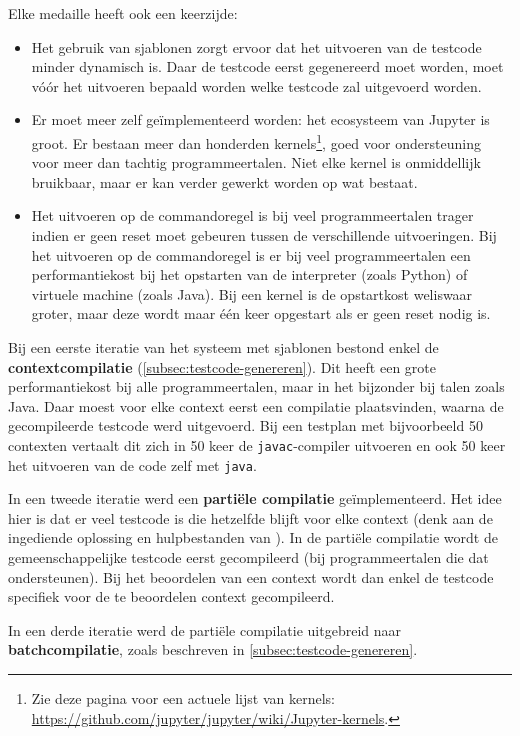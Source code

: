 Elke medaille heeft ook een keerzijde:
\begin{itemize}
    \item Het gebruik van sjablonen zorgt ervoor dat het uitvoeren van de testcode minder dynamisch is.
    Daar de testcode eerst gegenereerd moet worden, moet vóór het uitvoeren bepaald worden welke testcode zal uitgevoerd worden.
    \item Er moet meer zelf geïmplementeerd worden: het ecosysteem van Jupyter is groot.
    Er bestaan meer dan honderden kernels\footnote{Zie deze pagina voor een actuele lijst van kernels: \url{https://github.com/jupyter/jupyter/wiki/Jupyter-kernels}.}, goed voor ondersteuning voor meer dan tachtig programmeertalen.
    Niet elke kernel is onmiddellijk bruikbaar, maar er kan verder gewerkt worden op wat bestaat.
    \item Het uitvoeren op de commandoregel is bij veel programmeertalen trager indien er geen reset moet gebeuren tussen de verschillende uitvoeringen.
    Bij het uitvoeren op de commandoregel is er bij veel programmeertalen een performantiekost bij het opstarten van de interpreter (zoals Python) of virtuele machine (zoals Java).
    Bij een kernel is de opstartkost weliswaar groter, maar deze wordt maar één keer opgestart als er geen reset nodig is.
\end{itemize}

Bij een eerste iteratie van het systeem met sjablonen bestond enkel de \textbf{contextcompilatie} (\cref{subsec:testcode-genereren}).
Dit heeft een grote performantiekost bij alle programmeertalen, maar in het bijzonder bij talen zoals Java.
Daar moest voor elke context eerst een compilatie plaatsvinden, waarna de gecompileerde testcode werd uitgevoerd.
Bij een testplan met bijvoorbeeld 50 contexten vertaalt dit zich in 50 keer de \texttt{javac}-compiler uitvoeren en ook 50 keer het uitvoeren van de code zelf met \texttt{java}.

In een tweede iteratie werd een \textbf{partiële compilatie} geïmplementeerd.
Het idee hier is dat er veel testcode is die hetzelfde blijft voor elke context (denk aan de ingediende oplossing en hulpbestanden van \tested{}).
In de partiële compilatie wordt de gemeenschappelijke testcode eerst gecompileerd (bij programmeertalen die dat ondersteunen).
Bij het beoordelen van een context wordt dan enkel de testcode specifiek voor de te beoordelen context gecompileerd.

In een derde iteratie werd de partiële compilatie uitgebreid naar \textbf{batchcompilatie}, zoals beschreven in \cref{subsec:testcode-genereren}.

